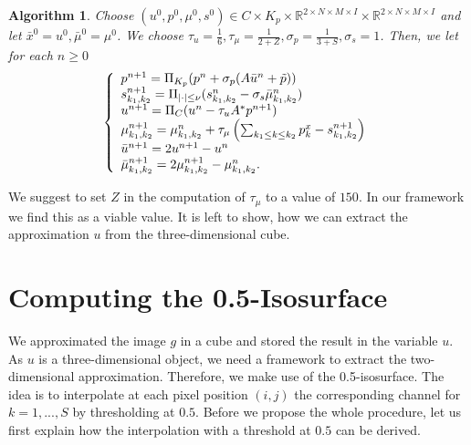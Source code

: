 \documentclass{scrreprt}
\newtheorem{algorithm}[theorem]{Algorithm}
\begin{document}
            \begin{algorithm}
                \label{alg:mumford_shah_lagrange_multiplier}
                Choose $(u^{0}, p^{0}, \mu^{0}, s^{0}) \in C \times K_{p} \times \mathbb{R}^{2 \times N \times M \times I} \times \mathbb{R}^{2 \times N \times M \times I}$ and let $\bar{x}^{0} = u^{0}, \bar{\mu}^{0} = \mu^{0}$. We choose $\tau_{u} = \frac{1}{6}, \tau_{\mu} = \frac{1}{2 + Z}, \sigma_{p} = \frac{1}{3 + S}, \sigma_{s} = 1$. Then, we let for each $n \ge 0$
                    \begin{equation}
                        \left\{ 
                            \begin{array}{l l}
                              p^{n+1} = \Pi_{K_{p}} (p^{n} + \sigma_{p} (A \bar{u}^{n} + \tilde{p})) \\
                              s_{k_{1}, k_{2}}^{n+1} = \Pi_{|\cdot| \le \nu} (s_{k_{1}, k_{2}}^{n} - \sigma_{s} \bar{\mu}_{k_{1}, k_{2}}^{n}) \\
                              u^{n+1} = \Pi_{C} (u^{n} - \tau_{u} A^{*} p^{n+1}) \\
                              \mu_{k_{1}, k_{2}}^{n+1} = \mu_{k_{1}, k_{2}}^{n} + \tau_{\mu} \left( \sum_{k_{1} \le k \le k_{2}} p^{x}_{k} - s_{k_{1}, k_{2}}^{n+1} \right) \\
                              \bar{u}^{n+1} = 2u^{n+1} - u^{n} \\
                              \bar{\mu}_{k_{1}, k_{2}}^{n+1} = 2\mu_{k_{1}, k_{2}}^{n+1} - \mu_{k_{1}, k_{2}}^{n}.
                            \end{array}
                        \right.
                    \end{equation}
            \end{algorithm}

        We suggest to set $Z$ in the computation of $\tau_{\mu}$ to a value of $150$. In our framework we find this as a viable value. It is left to show, how we can extract the approximation $u$ from the three-dimensional cube.

    \section{Computing the 0.5-Isosurface} %
    \label{sec:computing_the_0_5_isosurface}
        
        We approximated the image $g$ in a cube and stored the result in the variable $u$. As $u$ is a three-dimensional object, we need a framework to extract the two-dimensional approximation. Therefore, we make use of the 0.5-isosurface. The idea is to interpolate at each pixel position $(i,j)$ the corresponding channel for $k = 1, ..., S$ by thresholding at $0.5$. Before we propose the whole procedure, let us first explain how the interpolation with a threshold at $0.5$ can be derived.
\end{document}
